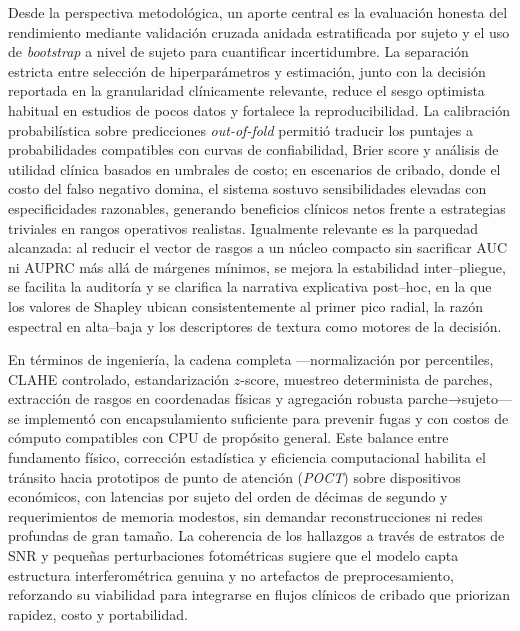 Desde la perspectiva metodológica, un aporte central es la evaluación honesta del rendimiento mediante validación cruzada anidada estratificada por sujeto y el uso de \emph{bootstrap} a nivel de sujeto para cuantificar incertidumbre. La separación estricta entre selección de hiperparámetros y estimación, junto con la decisión reportada en la granularidad clínicamente relevante, reduce el sesgo optimista habitual en estudios de pocos datos y fortalece la reproducibilidad. La calibración probabilística sobre predicciones \emph{out-of-fold} permitió traducir los puntajes a probabilidades compatibles con curvas de confiabilidad, Brier score y análisis de utilidad clínica basados en umbrales de costo; en escenarios de cribado, donde el costo del falso negativo domina, el sistema sostuvo sensibilidades elevadas con especificidades razonables, generando beneficios clínicos netos frente a estrategias triviales en rangos operativos realistas. Igualmente relevante es la parquedad alcanzada: al reducir el vector de rasgos a un núcleo compacto sin sacrificar AUC ni AUPRC más allá de márgenes mínimos, se mejora la estabilidad inter–pliegue, se facilita la auditoría y se clarifica la narrativa explicativa post–hoc, en la que los valores de Shapley ubican consistentemente al primer pico radial, la razón espectral en alta–baja y los descriptores de textura como motores de la decisión.

En términos de ingeniería, la cadena completa —normalización por percentiles, CLAHE controlado, estandarización $z$-score, muestreo determinista de parches, extracción de rasgos en coordenadas físicas y agregación robusta parche→sujeto— se implementó con encapsulamiento suficiente para prevenir fugas y con costos de cómputo compatibles con CPU de propósito general. Este balance entre fundamento físico, corrección estadística y eficiencia computacional habilita el tránsito hacia prototipos de punto de atención (\emph{POCT}) sobre dispositivos económicos, con latencias por sujeto del orden de décimas de segundo y requerimientos de memoria modestos, sin demandar reconstrucciones ni redes profundas de gran tamaño. La coherencia de los hallazgos a través de estratos de SNR y pequeñas perturbaciones fotométricas sugiere que el modelo capta estructura interferométrica genuina y no artefactos de preprocesamiento, reforzando su viabilidad para integrarse en flujos clínicos de cribado que priorizan rapidez, costo y portabilidad.

